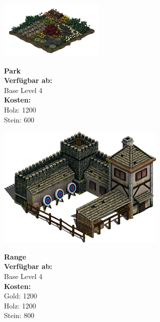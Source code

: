 \documentclass{scrartcl}
\begin{document}
\begin{minipage}{0.3\textwidth}
	\includegraphics[width=\textwidth]{imgPark.png}
\end{minipage}
\hfill
\begin{minipage}{0.5\textwidth}
	\textbf{Park}\\
	
	\textbf{Verfügbar ab: }\\ Base Level 4\\
	\textbf{Kosten:
	}\\
	Holz: 1200\\
	Stein: 600\\
	
\end{minipage}

\begin{minipage}{0.3\textwidth}
	\includegraphics[width=\textwidth]{imgRange.png}
\end{minipage}
\hfill
\begin{minipage}{0.5\textwidth}
	\textbf{Range}\\
	
	\textbf{Verfügbar ab: }\\ Base Level 4\\
	\textbf{Kosten:
	}\\
	Gold: 1200 \\
	Holz: 1200\\
	Stein: 800\\
	
\end{minipage}
\end{document}
